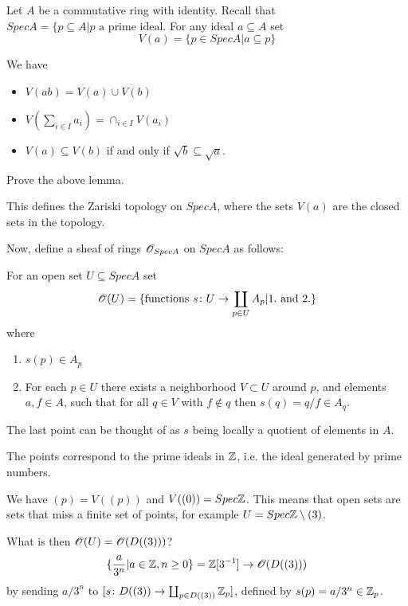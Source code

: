 Let $A$ be a commutative ring with identity. Recall that $Spec A = \{p\subseteq A|p \text{ a prime ideal}$. For any ideal $a\subseteq A$ set
\begin{equation*}
    V(a) = \{ p\in Spec A | a\subseteq p \}
\end{equation*}

\begin{lemma}
We have 
\begin{itemize}
    \item $V(ab) = V(a)\cup V(b)$
    \item $V(\sum_{i\in I} a_i) = \cap_{i\in I}V(a_i)$
    \item $V(a)\subseteq V(b)$ if and only if $\sqrt{b}\subseteq \sqrt{a}$. 
\end{itemize}
\end{lemma}
\begin{problem}
Prove the above lemma.
\end{problem}

This defines the Zariski topology on $Spec A$, where the sets $V(a)$ are the closed sets in the topology. 

Now, define a sheaf of rings $\mathscr{O}_{Spec A}$ on $Spec A$ as follows:

For an open set $U\subseteq Spec A$ set 
\begin{equation*}
    \mathscr{O}(U) = \{ \text{functions } s\colon U\to \coprod_{p\in U}A_p | 1. \text{ and } 2.\}
\end{equation*}
where 
\begin{enumerate}
    \item $s(p)\in A_p$
    \item For each $p\in U$ there exists a neighborhood $V\subset U$ around $p$, and elements $a,f\in A$, such that for all $q\in V$ with $f\notin q$ then $s(q)=q/f \in A_q$. 
\end{enumerate}
The last point can be thought of as $s$ being locally a quotient of elements in $A$. 

\begin{example}[$Spec \Z$]

The points correspond to the prime ideals in $\mathbb{Z}$, i.e. the ideal generated by prime numbers. 

We have $(p) = V((p))$ and $V((0)) = Spec\mathbb{Z}$. This means that open sets are sets that miss a finite set of points, for example $U = Spec \mathbb{Z} \setminus (3)$. 

What is then $\mathscr{O}(U) = \mathscr{O}(D((3)))$?
\begin{equation*}
    \{ \frac{a}{3^n}|a\in \mathbb{Z}, n\geq 0 \}=\mathbb{Z}[3^{-1}]\to \mathscr{O}(D((3)))
\end{equation*}
by sending $a/3^n$ to $[s\colon D((3))\to \coprod_{p\in D((3))} \mathbb{Z}_p]$, defined by $s(p) = a/3^n \in \mathbb{Z}_p$. 

\end{example}


